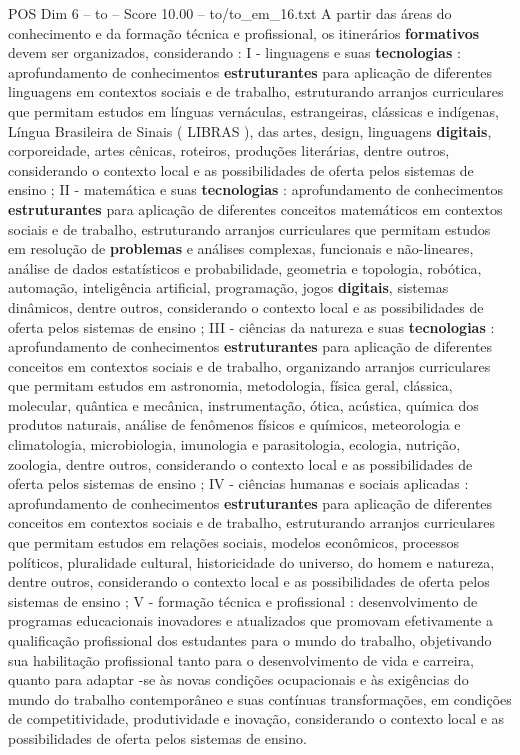 \begin{textsample}{POS Dim 6 – to – Score 10.00 – to/to\_em\_16.txt}
A partir das áreas do conhecimento e da formação técnica e profissional, os itinerários \textbf{formativos} devem ser organizados, considerando : I - linguagens e suas \textbf{tecnologias} : aprofundamento de conhecimentos \textbf{estruturantes} para aplicação de diferentes linguagens em contextos sociais e de trabalho, estruturando arranjos curriculares que permitam estudos em línguas vernáculas, estrangeiras, clássicas e indígenas, Língua Brasileira de Sinais ( LIBRAS ), das artes, design, linguagens \textbf{digitais}, corporeidade, artes cênicas, roteiros, produções literárias, dentre outros, considerando o contexto local e as possibilidades de oferta pelos sistemas de ensino ; II - matemática e suas \textbf{tecnologias} : aprofundamento de conhecimentos \textbf{estruturantes} para aplicação de diferentes conceitos matemáticos em contextos sociais e de trabalho, estruturando arranjos curriculares que permitam estudos em resolução de \textbf{problemas} e análises complexas, funcionais e não-lineares, análise de dados estatísticos e probabilidade, geometria e topologia, robótica, automação, inteligência artificial, programação, jogos \textbf{digitais}, sistemas dinâmicos, dentre outros, considerando o contexto local e as possibilidades de oferta pelos sistemas de ensino ; III - ciências da natureza e suas \textbf{tecnologias} : aprofundamento de conhecimentos \textbf{estruturantes} para aplicação de diferentes conceitos em contextos sociais e de trabalho, organizando arranjos curriculares que permitam estudos em astronomia, metodologia, física geral, clássica, molecular, quântica e mecânica, instrumentação, ótica, acústica, química dos produtos naturais, análise de fenômenos físicos e químicos, meteorologia e climatologia, microbiologia, imunologia e parasitologia, ecologia, nutrição, zoologia, dentre outros, considerando o contexto local e as possibilidades de oferta pelos sistemas de ensino ; IV - ciências humanas e sociais aplicadas : aprofundamento de conhecimentos \textbf{estruturantes} para aplicação de diferentes conceitos em contextos sociais e de trabalho, estruturando arranjos curriculares que permitam estudos em relações sociais, modelos econômicos, processos políticos, pluralidade cultural, historicidade do universo, do homem e natureza, dentre outros, considerando o contexto local e as possibilidades de oferta pelos sistemas de ensino ; V - formação técnica e profissional : desenvolvimento de programas educacionais inovadores e atualizados que promovam efetivamente a qualificação profissional dos estudantes para o mundo do trabalho, objetivando sua habilitação profissional tanto para o desenvolvimento de vida e carreira, quanto para adaptar -se às novas condições ocupacionais e às exigências do mundo do trabalho contemporâneo e suas contínuas transformações, em condições de competitividade, produtividade e inovação, considerando o contexto local e as possibilidades de oferta pelos sistemas de ensino.

\end{textsample}
